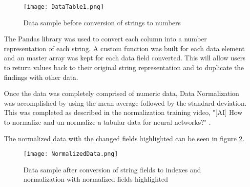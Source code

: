 \documentclass[a4paper,12pt]{article}
\begin{document}
\begin{figure}
\centerline{\texttt{[image: DataTable1.png]}}
\caption{Data sample before conversion of strings to numbers}
\label{fig:datatable1}
\end{figure}

The Pandas library was used to convert each column into a number representation of each string.  A custom function was built for each data element and an master array was kept for each data field converted.  This will allow users to return values back to their original string representation and to duplicate the findings with other data.

Once the data was completely comprised of numeric data, Data Normalization was accomplished by using the mean average followed by the standard deviation.  This was completed as described in the normalization training video, "[AI] How to normalize and un-normalize a tabular data for neural networks?" \cite{proj:normalize}.

The normalized data with the changed fields highlighted can be seen in figure \ref{fig:datanormal}.

\begin{figure}
\centerline{\texttt{[image: NormalizedData.png]}}
\caption{Data sample after conversion of string fields to indexes and normalization with normalized fields highlighted }
\label{fig:datanormal}
\end{figure}







\end{document}
